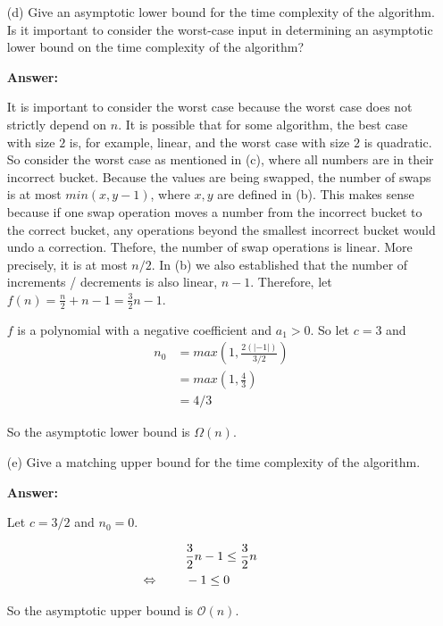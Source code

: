 \documentclass[14pt]{extreport}
\newcommand{\eq}[0]{\llap{\( \Leftrightarrow \) \qquad}}
\newcommand{\answer}[0]{\medskip \textbf{Answer:} \medskip}
\newcommand{\Bigo}[0]{\mathcal{O}}
\begin{document}
\begin{enumerate}
    \item[(d)] Give an asymptotic lower bound for the time complexity of the algorithm. Is it important to consider the worst-case input in determining an asymptotic lower bound on the time complexity of the algorithm?
    
        \answer

        It is important to consider the worst case because the worst case does not strictly depend on \( n \). It is possible that for some algorithm, the best case with size \( 2 \) is, for example, linear, and the worst case with size \( 2 \) is quadratic. So consider the worst case as mentioned in (c), where all numbers are in their incorrect bucket. Because the values are being swapped, the number of swaps is at most \( min(x, y - 1) \), where \( x, y \) are defined in (b). This makes sense because if one swap operation moves a number from the incorrect bucket to the correct bucket, any operations beyond the smallest incorrect bucket would undo a correction. Thefore, the number of swap operations is linear. More precisely, it is at most \( n / 2 \). In (b) we also established that the number of increments / decrements is also linear, \( n - 1 \). Therefore, let \( f(n) = \frac{n}{2} + n - 1 = \frac{3}{2}n - 1 \).

        \medskip
        
        \( f \) is a polynomial with a negative coefficient and \( a_1 > 0 \). So let \( c = 3 \) and
        \begin{align*}
            n_0 &= max(1, \frac{2(|-1|)}{3/2}) \\
                &= max(1, \frac{4}{3}) \\
                &= 4 / 3
        \end{align*}

        So the asymptotic lower bound is \( \Omega(n) \).

    \item[(e)] Give a matching upper bound for the time complexity of the algorithm.
    
        \answer

        Let \( c = 3/2 \) and \( n_0 = 0 \).

        \begin{align*}
            & \frac{3}{2}n - 1 \leq \frac{3}{2}n \\
            &\eq -1 \leq 0
        \end{align*} 

        So the asymptotic upper bound is \( \Bigo(n) \).

\end{enumerate}
\newpage
\end{document}
